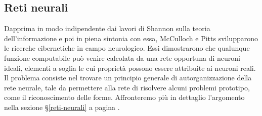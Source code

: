 \subsection{Reti neurali}
Dapprima in modo indipendente dai lavori di Shannon sulla teoria dell’informazione e poi in piena sintonia con essa, McCulloch e Pitts svilupparono le ricerche cibernetiche in campo neurologico. Essi dimostrarono che qualunque funzione computabile può venire calcolata da una rete opportuna di neuroni ideali, elementi a soglia le cui proprietà possono essere attribuite ai neuroni reali. Il problema consiste nel trovare un principio generale di autorganizzazione della rete neurale, tale da permettere alla rete di risolvere alcuni problemi prototipo, come il riconoscimento delle forme. Affronteremo più in dettaglio l'argomento nella sezione \S \ref{reti-neurali} a pagina \pageref{reti-neurali}.
